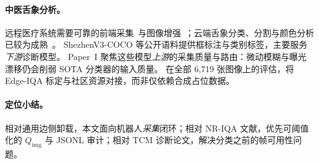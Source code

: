 \paragraph{中医舌象分析。}
远程医疗系统需要可靠的前端采集~\cite{chen2021telemed}与图像增强~\cite{deng2026op4ksr}；云端舌象分类、分割与颜色分析已较为成熟~\cite{zhang2020tongue,qi2016tongue,huang2015tcn}。
ShezhenV3-COCO 等公开语料提供框标注与类别标签，主要服务\emph{下游}诊断模型。
Paper~I 聚焦这些模型\emph{上游}的采集质量与路由：微动模糊与曝光漂移仍会削弱 SOTA 分类器的输入质量。
在全部 6{,}719 张图像上的评估，将 Edge-IQA 标定与社区资源对接，而非仅依赖合成占位数据。

\paragraph{定位小结。}
相对通用边侧卸载，本文面向机器人\emph{采集}闭环；相对 NR-IQA 文献，优先可阈值化的 $Q_{\mathrm{img}}$ 与 JSONL 审计；相对 TCM 诊断论文，解决分类之前的帧可用性问题。
